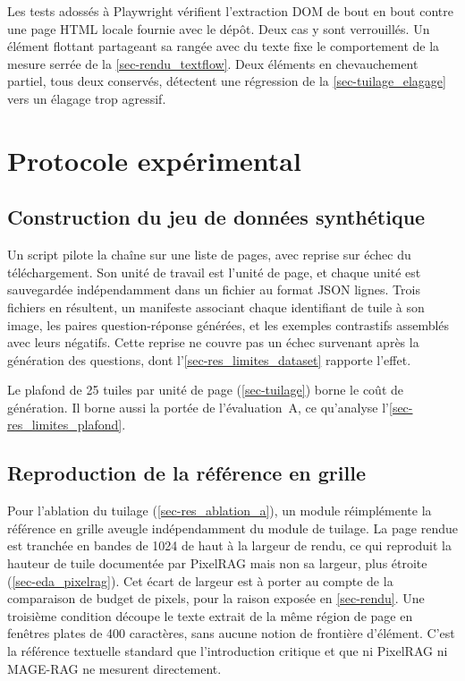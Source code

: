 Les tests adossés à Playwright vérifient l'extraction DOM de bout en bout contre
une page HTML locale fournie avec le dépôt. Deux cas y sont verrouillés. Un élément
flottant partageant sa rangée avec du texte fixe le comportement de la mesure
serrée de la \cref{sec-rendu_textflow}. Deux éléments en chevauchement partiel,
tous deux conservés, détectent une régression de la \cref{sec-tuilage_elagage} vers
un élagage trop agressif.


\section{Protocole expérimental}
\label{sec-protocole}
 
\subsection{Construction du jeu de données synthétique}
 
Un script pilote la chaîne sur une liste de pages, avec reprise sur échec du
téléchargement. Son unité de travail est l'unité de page, et chaque unité est
sauvegardée indépendamment dans un fichier au format JSON lignes. Trois fichiers
en résultent, un manifeste associant chaque identifiant de tuile à son image, les
paires question-réponse générées, et les exemples contrastifs assemblés avec leurs
négatifs. Cette reprise ne couvre pas un échec survenant après la génération
des questions, dont l'\cref{sec-res_limites_dataset} rapporte l'effet.
 
Le plafond de \num{25} tuiles par unité de page (\cref{sec-tuilage}) borne le coût
de génération. Il borne aussi la portée de l'évaluation~A, ce qu'analyse
l'\cref{sec-res_limites_plafond}.
 
\subsection{Reproduction de la référence en grille}
\label{sec-protocole_grille}
 
Pour l'ablation du tuilage (\cref{sec-res_ablation_a}), un module réimplémente la
référence en grille aveugle indépendamment du module de tuilage. La page rendue est
tranchée en bandes de \SI{1024}{\pixel} de haut à la largeur de rendu, ce qui
reproduit la hauteur de tuile documentée par PixelRAG mais non sa largeur, plus
étroite (\cref{sec-eda_pixelrag}). Cet écart de largeur est à porter au compte de
la comparaison de budget de pixels, pour la raison exposée en \cref{sec-rendu}. Une
troisième condition découpe le texte extrait de la même région de page en fenêtres
plates de \num{400} caractères, sans aucune notion de frontière d'élément. C'est la
référence textuelle standard que l'introduction critique et que ni PixelRAG ni
MAGE-RAG ne mesurent directement.
 
